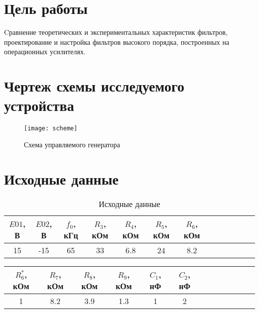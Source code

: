 





\section{Цель работы}

Cравнение теоретических и экспериментальных характеристик фильтров,
проектирование и настройка фильтров высокого порядка, построенных на
операционных усилителях. 

\section{Чертеж схемы исследуемого устройства}

\begin{figure}[H]
\begin{center}
	\texttt{[image: scheme]}
	\caption{Схема управляемого генератора}
\end{center}
\end{figure}

\section{Исходные данные}

\begin{table}[H]
\begin{center}
	\caption{Исходные данные}
	\def\tabcolsep{8pt}
	\begin{tabular}{|c|c|c|c|c|c|c|c|c|c|c|c|c|}
		\hline
		$E{01}$, В &
		$E{02}$, В &
		$f_0$, кГц &
		$R_3$, кОм &
		$R_4$, кОм &
		$R_5$, кОм &
		$R_6$, кОм \\
		\hline
		15 &
		-15 &
		65 &
		33 &
		6.8 &
		24 &
		8.2 \\
	    \hline	
	\end{tabular}
\end{center}
\end{table}

\begin{table}[H]
\begin{center}
	\def\tabcolsep{8pt}
	\begin{tabular}{|c|c|c|c|c|c|c|c|c|c|c|c|c|}
		\hline
		$R_6^*$, кОм &
		$R_7$, кОм &
		$R_8$, кОм &
		$R_9$, кОм &
		$C_1$, нФ &
		$C_2$, нФ \\
		\hline
		1 &
		8.2 &
		3.9 &
		1.3 &
		1 &
		2 \\
	    \hline	
	\end{tabular}
\end{center}
\end{table}

